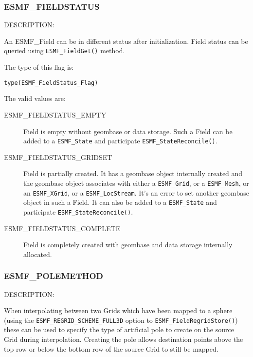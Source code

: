 
\subsubsection{ESMF\_FIELDSTATUS}
\label{opt:fieldstatus}

{\sf DESCRIPTION:\\}  
\begin{sloppypar}
An {ESMF\_Field} can be in different status after initialization. Field status can be queried using {\tt ESMF\_FieldGet()} method.
\end{sloppypar}

The type of this flag is:

{\tt type(ESMF\_FieldStatus\_Flag)}

The valid values are:
\begin{description}
\item [ESMF\_FIELDSTATUS\_EMPTY]
      Field is empty without geombase or data storage. Such a Field can be added to a {\tt ESMF\_State} and participate {\tt ESMF\_StateReconcile()}. 
\item [ESMF\_FIELDSTATUS\_GRIDSET]
      Field is partially created. It has a geombase object internally created and the geombase object associates with either a {\tt ESMF\_Grid}, or a {\tt ESMF\_Mesh}, or an {\tt ESMF\_XGrid}, or a {\tt ESMF\_LocStream}. It's an error to set another geombase object in such a Field. It can also be added to a {\tt ESMF\_State} and participate {\tt ESMF\_StateReconcile()}.
\item [ESMF\_FIELDSTATUS\_COMPLETE]
      Field is completely created with geombase and data storage internally allocated. 
\end{description}

\subsubsection{ESMF\_POLEMETHOD}
\label{opt:polemethod}

{\sf DESCRIPTION:\\}  
\begin{sloppypar}
When interpolating between two Grids which have been mapped to a sphere (using the {\tt ESMF\_REGRID\_SCHEME\_FULL3D} option to {\tt ESMF\_FieldRegridStore()}) these can be used to specify the type of artificial pole to create on the source Grid during interpolation. Creating the pole allows destination points above the top row or below the bottom row of the source Grid to still be mapped.
\end{sloppypar}

